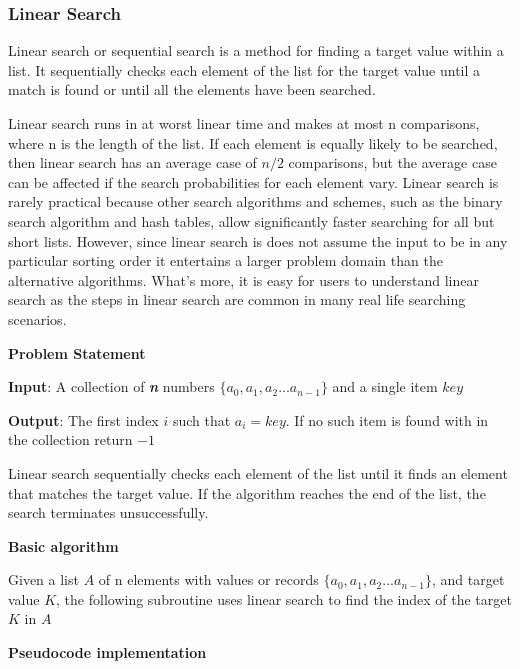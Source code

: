 \documentclass[12pt,a4paper]{book}
\begin{document}
\subsubsection{Linear Search}
Linear search or sequential search is a method for finding a target value within a list. It sequentially checks each element of the list for the target value until a match is found or until all the elements have been searched.
\par Linear search runs in at worst linear time and makes at most n comparisons, where n is the length of the list. If each element is equally likely to be searched, then linear search has an average case of $n/2$ comparisons, but the average case can be affected if the search probabilities for each element vary. Linear search is rarely practical because other search algorithms and schemes, such as the binary search algorithm and hash tables, allow significantly faster searching for all but short lists. However, since linear search is does not assume the input to be in any particular sorting order it entertains a larger problem domain than the alternative algorithms. What's more, it is easy for users to understand linear search as the steps in linear search are common in many real life searching scenarios. \par
\noindent \textbf {Problem Statement} \par
\textbf{Input}: A collection of \textbf{\textit{n}} numbers $\{a_{0} , a_{1} , a_{2} ... a_{n-1} \}$ and a single item $key$\par
\textbf{Output}: The first index $i$ such that  $a_{i} = key$. If no such item is found with in the collection return $-1$
\par Linear search sequentially checks each element of the list until it finds an element that matches the target value. If the algorithm reaches the end of the list, the search terminates unsuccessfully.\par
\noindent \textbf {Basic algorithm} \par
Given a list $A$ of n elements with values or records $\{a_{0} , a_{1} , a_{2} ... a_{n-1} \}$, and target value $K$, the following subroutine uses linear search to find the index of the target $K$ in $A$\par
\noindent \textbf {Pseudocode implementation}

\end{document}
